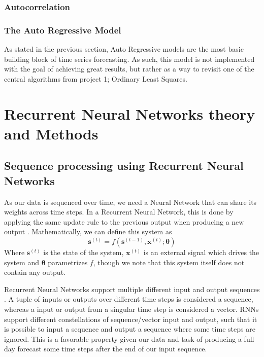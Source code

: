 \documentclass
[twocolumn,
secnumarabic,
nobibnotes,
aps,
prl,
reprint,
groupedaddress,
amsmath,
amssymb,
]{revtex4-2}
\begin{document}
\subsubsection{Autocorrelation}
\subsubsection{The Auto Regressive Model}
As stated in the previous section, Auto Regressive models are the most basic building block of time series forecasting. As such, this model is not implemented with the goal of achieving great results, but rather as a way to revisit one of the central algorithms from project 1; Ordinary Least Squares.





\section{Recurrent Neural Networks theory and Methods}

\subsection{Sequence processing using Recurrent Neural Networks}
As our data is sequenced over time, we need a Neural Network that can share its weights across time steps. In a Recurrent Neural Network, this is done by applying the same update rule to the previous output when producing a new output \cite{Goodfellow2016}. Mathematically, we can define this system as
\begin{equation}
  \nonumber
  \bm{s}^{(t)} = f(\bm{s}^{(t-1)},\bm{x}^{(t)};\bm{\theta})
\end{equation}
Where $\bm{s}^{(t)}$ is the state of the system, $\bm{x}^{(t)}$ is an external signal which drives the system and $\bm{\theta}$ parametrizes $f$, though we note that this system itself does not contain any output. 

Recurrent Neural Networks support multiple different input and output sequences \cite{Geron2019}. A tuple of inputs or outputs over different time steps is considered a sequence, whereas a input or output from a singular time step is considered a vector. RNNs support different constellations of sequence/vector input and output, such that it is possible to input a sequence and output a sequence where some time steps are ignored. This is a favorable property given our data and task of producing a full day forecast some time steps after the end of our input sequence.
\end{document}
